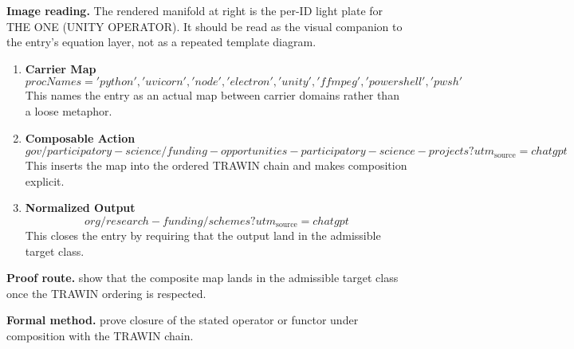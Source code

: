 \begin{samepage}
\noindent\begin{minipage}[t]{0.45\linewidth}
\vspace{0pt}
\raggedright
\scriptsize\textbf{Image reading.} The rendered manifold at right is the per-ID light plate for THE ONE (UNITY OPERATOR). It should be read as the visual companion to the entry's equation layer, not as a repeated template diagram.\par
\end{minipage}\hfill
\begin{minipage}[t]{0.53\linewidth}
\vspace*{-0.10in}
\raggedright
{}
\end{minipage}
\end{samepage}

\clearpage


\begin{enumerate}[leftmargin=1.6em,itemsep=9pt,topsep=6pt]
\item \textbf{Carrier Map}
\[
procNames = 'python','uvicorn','node','electron','unity','ffmpeg','powershell','pwsh'
\]
This names the entry as an actual map between carrier domains rather than a loose metaphor.

\item \textbf{Composable Action}
\[
gov/participatory-science/funding-opportunities-participatory-science-projects?utm_{\mathrm{source}}=chatgpt
\]
This inserts the map into the ordered TRAWIN chain and makes composition explicit.

\item \textbf{Normalized Output}
\[
org/research-funding/schemes?utm_{\mathrm{source}}=chatgpt
\]
This closes the entry by requiring that the output land in the admissible target class.
\end{enumerate}

\textbf{Proof route.} show that the composite map lands in the admissible target class once the TRAWIN ordering is respected.

\textbf{Formal method.} prove closure of the stated operator or functor under composition with the TRAWIN chain.

\medskip
{}

